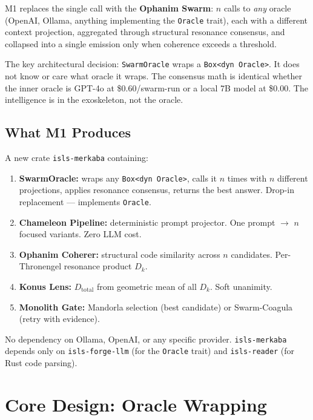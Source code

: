 \documentclass[11pt,a4paper]{article}
\begin{document}
M1 replaces the single call with the \textbf{Ophanim Swarm}: $n$ 
calls to \emph{any} oracle (OpenAI, Ollama, anything implementing 
the \texttt{Oracle} trait), each with a different context projection, 
aggregated through structural resonance consensus, and collapsed 
into a single emission only when coherence exceeds a threshold.

The key architectural decision: \texttt{SwarmOracle} wraps a 
\texttt{Box<dyn Oracle>}. It does not know or care what oracle it 
wraps. The consensus math is identical whether the inner oracle is 
GPT-4o at \$0.60/swarm-run or a local 7B model at \$0.00. 
The intelligence is in the exoskeleton, not the oracle.

\subsection{What M1 Produces}

A new crate \texttt{isls-merkaba} containing:

\begin{enumerate}[nosep]
\item \textbf{SwarmOracle:} wraps any \texttt{Box<dyn Oracle>}, 
      calls it $n$ times with $n$ different projections, applies 
      resonance consensus, returns the best answer. Drop-in 
      replacement --- implements \texttt{Oracle}.
\item \textbf{Chameleon Pipeline:} deterministic prompt projector. 
      One prompt $\to$ $n$ focused variants. Zero LLM cost.
\item \textbf{Ophanim Coherer:} structural code similarity across 
      $n$ candidates. Per-Thronengel resonance product $D_k$.
\item \textbf{Konus Lens:} $D_\text{total}$ from geometric mean 
      of all $D_k$. Soft unanimity.
\item \textbf{Monolith Gate:} Mandorla selection (best candidate) 
      or Swarm-Coagula (retry with evidence).
\end{enumerate}

No dependency on Ollama, OpenAI, or any specific provider. 
\texttt{isls-merkaba} depends only on \texttt{isls-forge-llm} 
(for the \texttt{Oracle} trait) and \texttt{isls-reader} 
(for Rust code parsing).


\section{Core Design: Oracle Wrapping}
\end{document}
